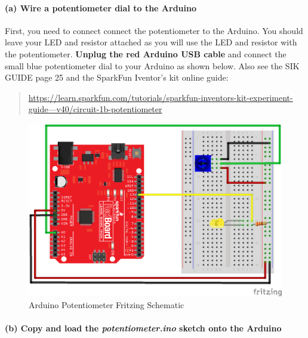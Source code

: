     \hypertarget{a-wire-a-potentiometer-dial-to-the-arduino}{%
\paragraph{(a) Wire a potentiometer dial to the
Arduino}\label{a-wire-a-potentiometer-dial-to-the-arduino}}

First, you need to connect connect the potentiometer to the Arduino. You
should leave your LED and resistor attached as you will use the LED and
resistor with the potentiometer. \textbf{Unplug the red Arduino USB
cable} and connect the small blue potentiometer dial to your Arduino as
shown below. Also see the SIK GUIDE page 25 and the SparkFun Iventor's
kit online guide:

\begin{quote}
\href{https://learn.sparkfun.com/tutorials/sparkfun-inventors-kit-experiment-guide---v40/circuit-1b-potentiometer}{https://learn.sparkfun.com/tutorials/sparkfun-inventors-kit-experiment-guide---v40/circuit-1b-potentiometer}
\end{quote}

\begin{figure}[h!]
\centering
\includegraphics{images/redboard_pot_led_fritzing.png}
\caption{Arduino Potentiometer Fritzing Schematic}
\end{figure}

\newpage

    \hypertarget{b-copy-and-load-the-potentiometer.ino-sketch-onto-the-arduino}{%
\paragraph{\texorpdfstring{(b) Copy and load the
\textbf{\emph{potentiometer.ino}} sketch onto the
Arduino}{(b) Copy and load the potentiometer.ino sketch onto the Arduino}}\label{b-copy-and-load-the-potentiometer.ino-sketch-onto-the-arduino}}

